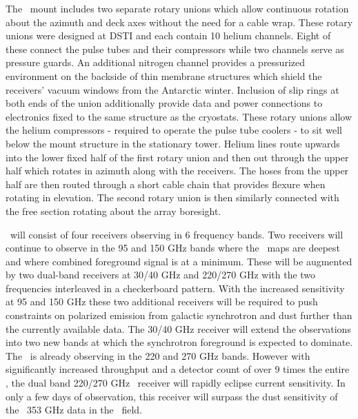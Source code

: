 \documentclass[]{spie}  %
\begin{document}
The \biceparray\ mount includes two separate rotary unions which allow
continuous rotation about the azimuth and deck axes without the need for a
cable wrap. These rotary unions were designed at DSTI and each contain 10
helium channels. Eight of these connect the pulse tubes and their compressors
while two channels serve as pressure guards. An additional nitrogen channel
provides a pressurized environment on the backside of thin membrane
structures which shield the receivers' vacuum windows from the Antarctic winter.
Inclusion of slip rings at both ends of the union additionally provide data and power
connections to electronics fixed to the same structure as the cryostats. These rotary
unions allow the helium compressors - required to operate the
pulse tube coolers - to sit well below the mount structure in the
stationary tower. Helium lines route upwards into the lower fixed half of the first
rotary union and then out through the upper half which rotates in azimuth
along with the receivers. The hoses from the upper half are then routed through a
short cable chain that provides flexure when rotating in elevation. The
second rotary union is then similarly connected with the free section rotating
about the array boresight.



\biceparray\ will consist of four receivers observing in 6 frequency bands.
Two receivers will continue to observe in the 95 and 150 GHz bands where the
\bk\ maps are deepest and where combined foreground
signal is at a minimum. These will be augmented by two dual-band receivers at
30/40 GHz and 220/270 GHz with the two frequencies interleaved in a
checkerboard pattern. With the increased sensitivity at 95 and 150 GHz these
two additional receivers will be required to push constraints on polarized
emission from galactic synchrotron and dust further than the currently available data.
The 30/40 GHz receiver will extend the observations into two
new bands at which the synchrotron foreground is expected to dominate. The
\keckarray\ is already observing in the 220 and 270 GHz bands.  However with
significantly increased throughput and a detector count of over 9 times the
entire \keckarray, the dual band 220/270 GHz \biceparray\ receiver will rapidly
eclipse current sensitivity. In only a few days of observation,
this receiver will surpass the dust sensitivity of the \planck\ 353 GHz data in
the \bk\ field. 
\end{document}
